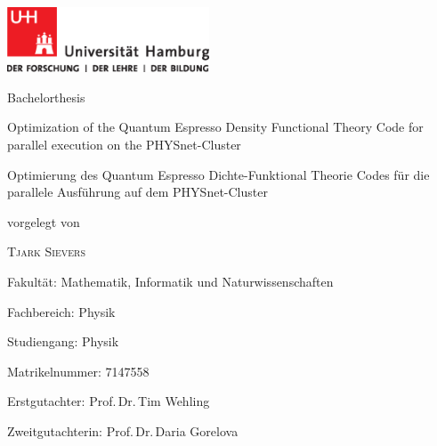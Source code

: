 \documentclass[main.tex]{subfiles}
\begin{document}
\begin{titlepage}
    \includegraphics[width=6cm]{images/up-uhh-logo-u-2010-u-farbe-u-cmyk}\par
    \vspace{4\baselineskip}

    \begin{center}
        {\Large\textcolor{UHHred}{Bachelorthesis}\par}

        {\Huge Optimization of the Quantum Espresso Density Functional Theory Code for parallel execution on the PHYSnet-Cluster\par}

        \vspace{1\baselineskip}
        
        {\Large Optimierung des Quantum Espresso Dichte-Funktional Theorie Codes für die parallele Ausführung auf dem PHYSnet-Cluster\par}

        \vspace{4\baselineskip}

        vorgelegt von\par

        {\Large\textsc{Tjark Sievers}\par}
    \end{center}

    \vfill

    Fakultät: Mathematik, Informatik und Naturwissenschaften\par
    Fachbereich: Physik\par
    Studiengang: Physik\par
    Matrikelnummer: 7147558\par
 
    Erstgutachter: Prof.\,Dr.\,Tim Wehling \par
    Zweitgutachterin: Prof.\,Dr.\,Daria Gorelova \par
\end{titlepage}
\end{document}
